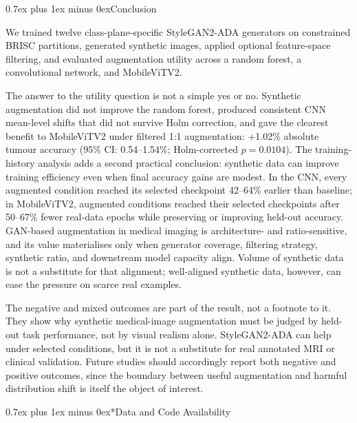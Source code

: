 \documentclass[conference,twoside]{IEEEtran}
\makeatletter
\newcommand{\figfont}{\sffamily}
\def\section{\@startsection{section}{1}{\z@}{1.5ex plus 1.5ex minus 0.5ex}%
{0.7ex plus 1ex minus 0ex}{\normalfont\normalsize\figfont\scshape\bfseries\centering}}
\makeatother
\begin{document}
\section{Conclusion}

We trained twelve class-plane-specific StyleGAN2-ADA generators on constrained BRISC partitions, generated synthetic images, applied optional feature-space filtering, and evaluated augmentation utility across a random forest, a convolutional network, and MobileViTV2.

The answer to the utility question is not a simple yes or no. Synthetic augmentation did not improve the random forest, produced consistent CNN mean-level shifts that did not survive Holm correction, and gave the clearest benefit to MobileViTV2 under filtered 1:1 augmentation: +1.02\% absolute tumour accuracy (95\% CI: 0.54--1.54\%; Holm-corrected $p=0.0104$). The training-history analysis adds a second practical conclusion: synthetic data can improve training efficiency even when final accuracy gains are modest. In the CNN, every augmented condition reached its selected checkpoint 42--64\% earlier than baseline; in MobileViTV2, augmented conditions reached their selected checkpoints after 50--67\% fewer real-data epochs while preserving or improving held-out accuracy. GAN-based augmentation in medical imaging is architecture- and ratio-sensitive, and its value materialises only when generator coverage, filtering strategy, synthetic ratio, and downstream model capacity align. Volume of synthetic data is not a substitute for that alignment; well-aligned synthetic data, however, can ease the pressure on scarce real examples.

The negative and mixed outcomes are part of the result, not a footnote to it. They show why synthetic medical-image augmentation must be judged by held-out task performance, not by visual realism alone. StyleGAN2-ADA can help under selected conditions, but it is not a substitute for real annotated MRI or clinical validation. Future studies should accordingly report both negative and positive outcomes, since the boundary between useful augmentation and harmful distribution shift is itself the object of interest.

\section*{Data and Code Availability}
\end{document}
